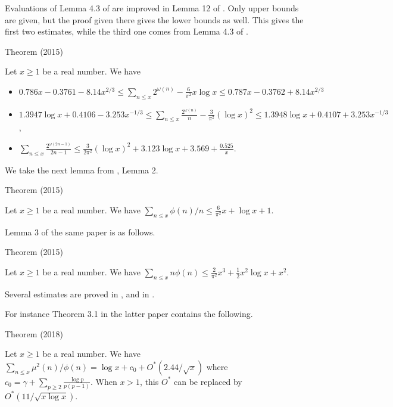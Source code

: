 \par 
Evaluations of Lemma 4.3  of
\cite{Cipu*15-1}
are improved in Lemma 12 of
\cite{Trudgian*15-2}.
Only upper bounds are given, but the proof given there gives the lower
bounds as well. This gives the first two estimates, while the third
one comes from 
Lemma 4.3  of
\cite{Cipu*15-1}.
\par 
\begin{thm}{Theorem (2015)}

  Let $x\ge1$ be a real number. We have
  \begin{itemize}
\item  
  $\displaystyle 0.786x-0.3761-8.14x^{2/3}
  \le \sum_{n\le x}2^{\omega(n)}-\frac{6}{\pi^2}x\log x
    \le 0.787x-0.3762+8.14x^{2/3}$

\item  
 $\displaystyle 1.3947\log x+0.4106-3.253x^{-1/3}
  \le \sum_{n\le x}\frac{2^{\omega(n)}}{n}-\frac{3}{\pi^2}(\log x)^2
    \le 1.3948\log x+0.4107+3.253x^{-1/3}$,

\item  
  $\displaystyle \sum_{n\le x}\frac{2^{\omega(2n-1)}}{2n-1}
  \le \frac{3}{2\pi^2}(\log x)^2+3.123\log x+3.569+\frac{0.525}{x}$.

\end{itemize}
\end{thm}



We take the next lemma from
\cite{Trevino*15-2}, Lemma 2.
\par 
\begin{thm}{Theorem (2015)}

  Let $x\ge1$ be a real number. We have
  $\sum_{n\le x}\phi(n)/n\le \frac{6}{\pi^2}x+\log x +1$.
\end{thm}

  

Lemma 3 of the same paper is as follows.
\par 
\begin{thm}{Theorem (2015)}

  Let $x\ge1$ be a real number. We have
  $\sum_{n\le x}n\phi(n)\le \frac{2}{\pi^2}x^3+\frac12x^2\log x +x^2$.
\end{thm}


Several estimates are proved in
\cite{Ramare*14-1},
\cite{Ramare*13a}
and in
\cite{Ramare*18-9}.

For instance Theorem 3.1 in the latter paper contains the following.
\par 
\begin{thm}{Theorem (2018)}

  Let $x\ge1$ be a real number. We have
  $\sum_{n\le x}\mu^2(n)/\phi(n)= \log x
  +c_0+O^*(2.44/\sqrt{x})$ where $\displaystyle c_0=\gamma+\sum_{p\ge2}\frac{\log
  p}{p(p-1)}$.
  When $x > 1$, this $O^*$ can be replaced
  by $O^*(11/\sqrt{x\log x})$. 
\end{thm}

